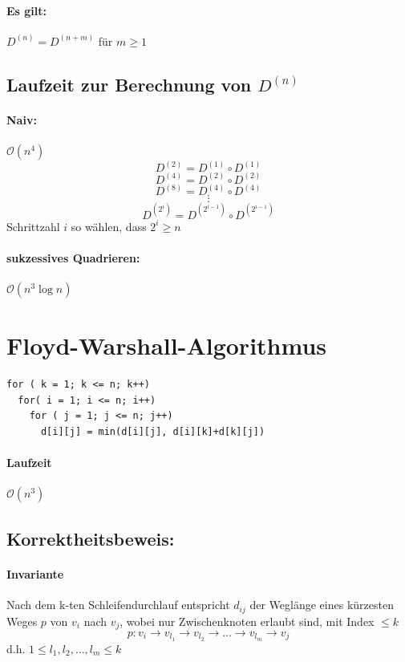 \paragraph{Es gilt:} $D^{(n)} = D^{(n+m)}$ für $m\geq 1$
\subsection{Laufzeit zur Berechnung von $D^{(n)}$ }
\paragraph{Naiv:} $\mathcal{O}(n^4)$
\[ D^{(2)} = D^{(1)} \circ D^{(1)} \]
\[ D^{(4)} = D^{(2)} \circ D^{(2)} \]
\[ D^{(8)} = D^{(4)} \circ D^{(4)} \]
\[ \vdots\]
\[ D^{(2^i)} = D^{(2^{i-1})} \circ D^{(2^{i-1})} \]
Schrittzahl $i$ so wählen, dass $2^i \geq n$
\paragraph{sukzessives Quadrieren:} $\mathcal{O}(n^3\log n)$
\section{Floyd-Warshall-Algorithmus}
\begin{lstlisting}[style = pseudo]
for ( k = 1; k <= n; k++)
  for( i = 1; i <= n; i++)
    for ( j = 1; j <= n; j++)
      d[i][j] = min(d[i][j], d[i][k]+d[k][j])
\end{lstlisting}
\paragraph{Laufzeit} $\mathcal{O}(n^3)$
\subsection{Korrektheitsbeweis:}
\paragraph{Invariante} Nach dem k-ten Schleifendurchlauf entspricht $d_{ij}$ der Weglänge eines kürzesten Weges $p$ von $v_i$ nach $v_j$, 
wobei nur Zwischenknoten erlaubt sind, mit Index $\leq k$  \[p:v_i \rightarrow v_{l_1} \rightarrow v_{l_2} \rightarrow \ldots \rightarrow v_{l_m} \rightarrow v_j\]
d.h. $1\leq l_1,l_2,\ldots,l_m\leq k$
\pagebreak
